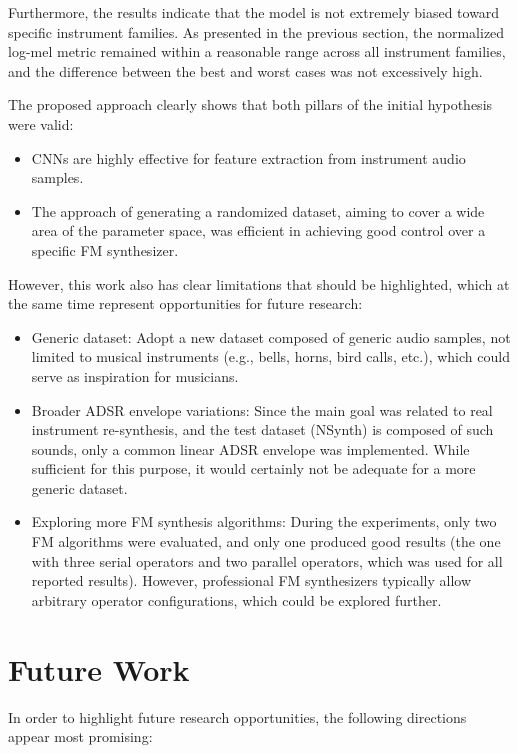 \documentclass[sigconf,natbib=false]{acmart}
\begin{document}
Furthermore, the results indicate that the model is not extremely biased toward specific instrument families. As presented in the previous section, the normalized log-mel metric remained within a reasonable range across all instrument families, and the difference between the best and worst cases was not excessively high.

The proposed approach clearly shows that both pillars of the initial hypothesis were valid:
\begin{itemize}
\item CNNs are highly effective for feature extraction from instrument audio samples.
\item The approach of generating a randomized dataset, aiming to cover a wide area of the parameter space, was efficient in achieving good control over a specific FM synthesizer.
\end{itemize}

However, this work also has clear limitations that should be highlighted, which at the same time represent opportunities for future research:
\begin{itemize}
\item Generic dataset: Adopt a new dataset composed of generic audio samples, not limited to musical instruments (e.g., bells, horns, bird calls, etc.), which could serve as inspiration for musicians.
\item Broader ADSR envelope variations: Since the main goal was related to real instrument re-synthesis, and the test dataset (NSynth) is composed of such sounds, only a common linear ADSR envelope was implemented. While sufficient for this purpose, it would certainly not be adequate for a more generic dataset.
\item Exploring more FM synthesis algorithms: During the experiments, only two FM algorithms were evaluated, and only one produced good results (the one with three serial operators and two parallel operators, which was used for all reported results). However, professional FM synthesizers typically allow arbitrary operator configurations, which could be explored further.
\end{itemize}

\section{Future Work}

In order to highlight future research opportunities, the following directions appear most promising:
\end{document}
